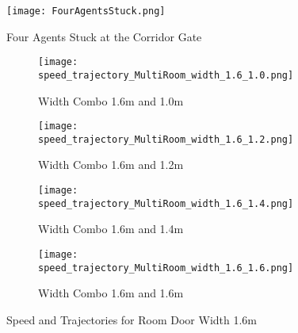 \begin{figure}
    \centering
    \texttt{[image: FourAgentsStuck.png]}
    \caption{Four Agents Stuck at the Corridor Gate}
    \label{fig:four_agents_stuck}
\end{figure}


\begin{figure}[h]
    \centering
        \begin{subfigure}[b]{.45\linewidth}
        \texttt{[image: 
            speed\_trajectory\_MultiRoom\_width\_1.6\_1.0.png]}
        \caption{Width Combo 1.6m and 1.0m}
        \label{fig:width_combo_1.6_1.0m}
    \end{subfigure}
    \begin{subfigure}[b]{.45\linewidth}
        \texttt{[image: 
            speed\_trajectory\_MultiRoom\_width\_1.6\_1.2.png]}
        \caption{Width Combo 1.6m and 1.2m}
        \label{fig:width_combo_1.6_1.2m}
    \end{subfigure}

    \begin{subfigure}[b]{.45\linewidth}
        \texttt{[image: 
            speed\_trajectory\_MultiRoom\_width\_1.6\_1.4.png]}
        \caption{Width Combo 1.6m and 1.4m}
        \label{fig:width_combo_1.6_1.4m}
    \end{subfigure}
        \begin{subfigure}[b]{.45\linewidth}
        \texttt{[image: 
            speed\_trajectory\_MultiRoom\_width\_1.6\_1.6.png]}
        \caption{Width Combo 1.6m and 1.6m}
        \label{fig:width_combo_1.6_1.6m}
    \end{subfigure}

    \caption{Speed and Trajectories for Room Door Width 1.6m}
    \label{fig:width_combo_1.6_x}
\end{figure}